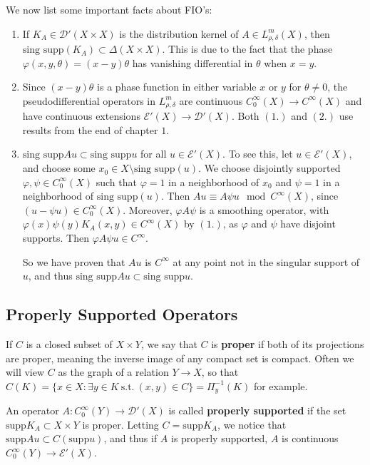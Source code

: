 \documentclass[11pt, reqno]{article}
\theoremstyle{plain}
\theoremstyle{definition}
\theoremstyle{remark}
\renewcommand{\phi}{\varphi}
\newcommand{\sing}{\text{sing\ supp}}
\newcommand{\supp}{\text{supp}}
\begin{document}
We now list some important facts about FIO's:
\begin{enumerate}
    \item[1.] If $K_A \in \mathcal{D}'(X\times X)$ is the distribution kernel of $A \in L_{\rho,\delta}^m(X)$,
    then $\sing(K_A) \subset \Delta(X\times X)$. This is due to the fact that the phase
    $\phi(x,y,\theta) = (x-y)\theta$ has vanishing differential in $\theta$ when $x = y$. 

    \item[2.] Since $(x-y)\theta$ is a phase function in either variable $x$ or $y$ for $\theta
    \neq 0$, the pseudodifferential operators in $L_{\rho,\delta}^m$ are continuous 
    $C_0^\infty(X) \to C^\infty(X)$ and have continuous extensions $\mathcal{E}'(X) \to 
    \mathcal{D}'(X)$. Both $(1.)$ and $(2.)$ use results from the end of chapter $1$.

    \item[3.] $\sing Au \subset \sing u$ for all $u \in \mathcal{E}'(X)$. To see this, 
    let $u \in \mathcal{E}'(X)$, and choose some $x_0 \in X\setminus \sing (u)$. We choose 
    disjointly supported $\phi,\psi \in C_0^\infty(X)$ 
    such that $\phi = 1$ in a neighborhood of $x_0$ and
    $\psi = 1$ in a neighborhood of $\sing(u)$. Then $Au \equiv A\psi u \mod C^\infty(X)$,
    since $(u - \psi u) \in C_0^\infty(X)$. Moreover, $\phi A\psi$ is a smoothing operator,
    with $\phi(x)\psi(y)K_A(x,y) \in C^\infty(X)$ by $(1.)$, as $\phi$ and $\psi$ have disjoint
    supports. Then $\phi A \psi u \in C^\infty$.

    So we have proven that $Au$ is $C^\infty$ at any point not in the singular support of $u$, and
    thus $\sing Au \subset \sing u$.
\end{enumerate}

\subsection{Properly Supported Operators}

If $C$ is a closed subset of $X\times Y$, we say that $C$ is \textbf{proper} if 
both of its projections are proper, meaning the inverse image of any compact set is compact. 
Often we will view $C$ as the graph of a relation $Y \rightarrow X$, so that 
$C(K) = \{x \in X: \exists y \in K\ \text{s.t.}\ (x,y) \in C\} = \Pi_{y}^{-1}(K)$ for example.

An operator $A: C_0^\infty(Y) \to \mathcal{D}'(X)$ is called \textbf{properly supported} if the set
$\supp K_A \subset X \times Y$ is proper. Letting $C = \supp K_A$, we notice that 
$\supp Au \subset C(\supp u)$, and thus if $A$ is properly supported, $A$ is continuous
$C_0^\infty(Y) \to \mathcal{E}'(X)$. 
\end{document}
